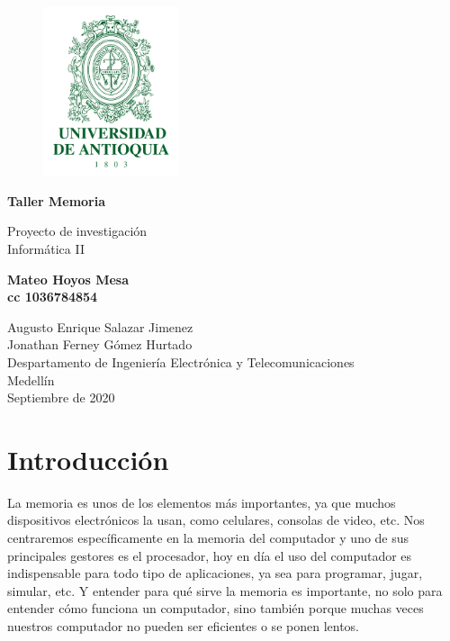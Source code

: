 \documentclass{article}
\begin{document}
\begin{titlepage}
    \begin{center}
        \vspace*{1cm}
        
        \begin{figure}[h]
        \includegraphics[width=4cm]{udea.png}
        \centering
        \label{fig:udea}
        \end{figure}
            
        \Huge
        \textbf{Taller Memoria}
            
        \vspace{0.5cm}
        \LARGE
        Proyecto de investigación\\
        Informática II 
            
        \vspace{1.5cm}
            
        \textbf{Mateo Hoyos Mesa}\\
        \textbf{cc 1036784854}
            
        \vfill
            
        \vspace{0.8cm}
            
        \Large
        Augusto Enrique Salazar Jimenez\\
        Jonathan Ferney Gómez Hurtado\\
        Despartamento de Ingeniería Electrónica y Telecomunicaciones\\
        Medellín\\
        Septiembre de 2020
            
    \end{center}
\end{titlepage}

\tableofcontents
\newpage
\section{Introducción}\label{intro}
La memoria es unos de los elementos más importantes, ya que muchos dispositivos electrónicos la usan, como celulares, consolas de video, etc. Nos centraremos específicamente en la memoria del computador y uno de sus principales gestores es el procesador, hoy en día el uso del computador es indispensable para todo tipo de aplicaciones, ya sea para programar, jugar, simular, etc. Y entender para qué sirve la memoria es importante, no solo para entender cómo funciona un computador, sino también porque muchas veces nuestros computador no pueden ser eficientes o se ponen lentos.
\end{document}
